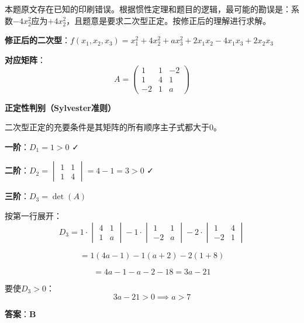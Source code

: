 \documentclass[standard]{ExBook}
\begin{document}
\begin{qitems}
\begin{bbox}
\begin{solution}
            本题原文存在已知的印刷错误。根据惯性定理和题目的逻辑，最可能的勘误是：系数$-4x_2^2$应为$+4x_2^2$，且题意是要求二次型正定。按修正后的理解进行求解。
            
            \textbf{修正后的二次型}：$f(x_1,x_2,x_3)=x_1^2+4x_2^2+ax_3^2+2x_1x_2-4x_1x_3+2x_2x_3$
            
            \textbf{对应矩阵}：$$A = \begin{pmatrix} 1 & 1 & -2 \\ 1 & 4 & 1 \\ -2 & 1 & a \end{pmatrix}$$
            
            \textbf{正定性判别（Sylvester准则）}
            
            二次型正定的充要条件是其矩阵的所有顺序主子式都大于0。
            
            \textbf{一阶}：$D_1 = 1 > 0$ ✓
            
            \textbf{二阶}：$D_2 = \begin{vmatrix} 1 & 1 \\ 1 & 4 \end{vmatrix} = 4-1=3 > 0$ ✓
            
            \textbf{三阶}：$D_3 = \det(A)$
            
            按第一行展开：
            $$D_3 = 1 \cdot \begin{vmatrix} 4 & 1 \\ 1 & a \end{vmatrix} - 1 \cdot \begin{vmatrix} 1 & 1 \\ -2 & a \end{vmatrix} - 2 \cdot \begin{vmatrix} 1 & 4 \\ -2 & 1 \end{vmatrix}$$
            
            $$= 1(4a-1) - 1(a+2) - 2(1+8)$$
            
            $$= 4a-1-a-2-18 = 3a-21$$
            
            要使$D_3 > 0$：$$3a-21>0 \implies a>7$$
            
            \textbf{答案}：\textbf{B}
        \end{solution}
    \end{bbox}


\end{qitems}
\end{document}
